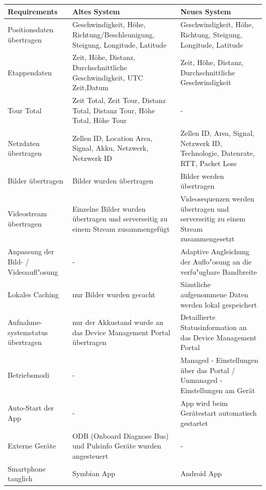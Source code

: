 {\renewcommand{\arraystretch}{2}%
    \begin{longtable}{  p{3.5cm} | p{4.3cm} | p{4.3cm} }
    
    \textbf{Requirements} & \textbf{Altes System} & \textbf{Neues System} \\ \hline
\hline
    Positionsdaten \"{u}bertragen & Geschwindigkeit, H\"{o}he, Richtung/Beschleunigung, Steigung, Longitude, Latitude & Geschwindigkeit, H\"{o}he, Richtung, Steigung, Longitude, Latitude \\ \hline
    Etappendaten & Zeit, H\"{o}he, Distanz, Durchschnittliche Geschwindigkeit, UTC Zeit,Datum & Zeit, H\"{o}he, Distanz, Durchschnittliche Geschwindigkeit \\
    \hline
     Tour Total & Zeit Total, Zeit Tour, Distanz Total, Distanz Tour, H\"{o}he Total, H\"{o}he Tour & - \\
    \hline
    Netzdaten \"{u}bertragen & Zellen ID, Location Area, Signal, Akku, Netzwerk, Netzwerk ID & Zellen ID, Area, Signal, Netzwerk ID, Technologie, Datenrate, RTT, Packet Loss\\
    \hline
    Bilder \"{u}bertragen & Bilder wurden \"{u}bertragen & Bilder werden \"{u}bertragen\\
    \hline
    Videostream \"{u}bertragen & Einzelne Bilder wurden \"{u}bertragen und serverseitig zu einem Stream zusammengef\"{u}gt & Videosequenzen werden \"{u}bertragen und serverseitig zu einem Stream zusammengesetzt\\
    \hline
    Anpassung der Bild- / Videoaufl"osung & - & Adaptive Angleichung der Auflo"osung an die verfu"ugbare Bandbreite\\
    \hline
    Lokales Caching & nur Bilder wurden gecacht & S\"{a}mtliche aufgenommene Daten werden lokal gespeichert\\
    \hline
	Aufnahme- systemstatus \"{u}bertragen & nur der Akkustand wurde an das Device Management Portal \"{u}bertragen & Detaillierte Statusinformation an das Device Management Portal\\
    \hline    
    Betriebsmodi & - & Managed - Einstellungen \"{u}ber das Portal / Unmanaged - Einstellungen am Ger\"{a}t\\
    \hline
	Auto-Start der App & - & App wird beim Ger\"{a}testart automatisch gestartet\\
    \hline    
    Externe Ger\"{a}te & ODB (Onboard Diagnose Bus) und Pulsinfo Ger\"{a}te wurden angesteuert & -\\
    \hline  
    Smartphone tauglich & Symbian App & Android App\\

\end{longtable}}
